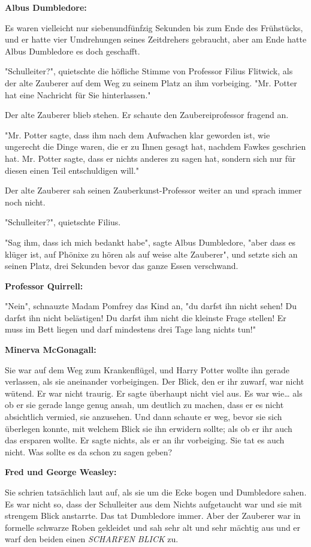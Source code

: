{\textbf{Albus Dumbledore:}

Es waren vielleicht nur siebenundfünfzig Sekunden bis zum Ende des Frühstücks, und er hatte vier Umdrehungen seines Zeitdrehers gebraucht, aber am Ende hatte Albus Dumbledore es doch geschafft.

"Schulleiter?", quietschte die höfliche Stimme von Professor Filius Flitwick, als der alte Zauberer auf dem Weg zu seinem Platz an ihm vorbeiging. "Mr. Potter hat eine Nachricht für Sie hinterlassen."

Der alte Zauberer blieb stehen. Er schaute den Zaubereiprofessor fragend an.

"Mr. Potter sagte, dass ihm nach dem Aufwachen klar geworden ist, wie ungerecht die Dinge waren, die er zu Ihnen gesagt hat, nachdem Fawkes geschrien hat. Mr. Potter sagte, dass er nichts anderes zu sagen hat, sondern sich nur für diesen einen Teil entschuldigen will."

Der alte Zauberer sah seinen Zauberkunst-Professor weiter an und sprach immer noch nicht.

"Schulleiter?", quietschte Filius.

"Sag ihm, dass ich mich bedankt habe", sagte Albus Dumbledore, "aber dass es klüger ist, auf Phönixe zu hören als auf weise alte Zauberer", und setzte sich an seinen Platz, drei Sekunden bevor das ganze Essen verschwand.

\textbf{Professor Quirrell:}

"Nein", schnauzte Madam Pomfrey das Kind an, "du darfst ihn nicht sehen! Du darfst ihn nicht belästigen! Du darfst ihm nicht die kleinste Frage stellen! Er muss im Bett liegen und darf mindestens drei Tage lang nichts tun!"

\textbf{Minerva McGonagall:}

Sie war auf dem Weg zum Krankenflügel, und Harry Potter wollte ihn gerade verlassen, als sie aneinander vorbeigingen. Der Blick, den er ihr zuwarf, war nicht wütend. Er war nicht traurig. Er sagte überhaupt nicht viel aus. Es war wie… als ob er sie gerade lange genug ansah, um deutlich zu machen, dass er es nicht absichtlich vermied, sie anzusehen. Und dann schaute er weg, bevor sie sich überlegen konnte, mit welchem Blick sie ihn erwidern sollte; als ob er ihr auch das ersparen wollte. Er sagte nichts, als er an ihr vorbeiging. Sie tat es auch nicht. Was sollte es da schon zu sagen geben?

\textbf{Fred und George Weasley:}

Sie schrien tatsächlich laut auf, als sie um die Ecke bogen und Dumbledore sahen. Es war nicht so, dass der Schulleiter aus dem Nichts aufgetaucht war und sie mit strengem Blick anstarrte. Das tat Dumbledore immer. Aber der Zauberer war in formelle schwarze Roben gekleidet und sah sehr alt und sehr mächtig aus und er warf den beiden einen \emph{SCHARFEN BLICK} zu.

}
